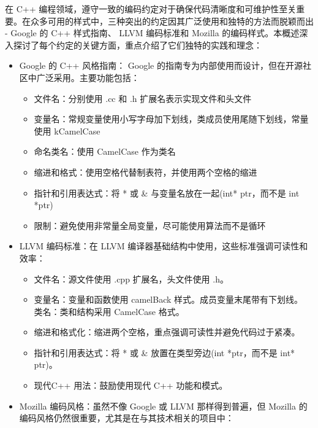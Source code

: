 在 C++ 编程领域，遵守一致的编码约定对于确保代码清晰度和可维护性至关重要。在众多可用的样式中，三种突出的约定因其广泛使用和独特的方法而脱颖而出 - Google 的 C++ 样式指南、 LLVM 编码标准和 Mozilla 的编码样式。本概述深入探讨了每个约定的关键方面，重点介绍了它们独特的实践和理念：

\begin{itemize}
\item
Google 的 C++ 风格指南： Google 的指南专为内部使用而设计，但在开源社区中广泛采用。主要功能包括：
\begin{itemize}
\item
文件名：分别使用 .cc 和 .h 扩展名表示实现文件和头文件

\item
变量名：常规变量使用小写字母加下划线，类成员使用尾随下划线，常量使用 kCamelCase

\item
命名类名：使用 CamelCase 作为类名

\item
缩进和格式：使用空格代替制表符，并使用两个空格的缩进

\item
指针和引用表达式：将 * 或 \& 与变量名放在一起(int* ptr，而不是 int *ptr)

\item
限制：避免使用非常量全局变量，尽可能使用算法而不是循环
\end{itemize}

\item
LLVM 编码标准：在 LLVM 编译器基础结构中使用，这些标准强调可读性和效率：

\begin{itemize}
\item
文件名：源文件使用 .cpp 扩展名，头文件使用 .h。

\item
变量名：变量和函数使用 camelBack 样式。成员变量末尾带有下划线。 类名：类和结构采用 CamelCase 格式。

\item
缩进和格式化：缩进两个空格，重点强调可读性并避免代码过于紧凑。

\item
指针和引用表达式：将 * 或 \& 放置在类型旁边(int *ptr，而不是 int* ptr)。

\item
现代C++ 用法：鼓励使用现代 C++ 功能和模式。
\end{itemize}

\item
Mozilla 编码风格：虽然不像 Google 或 LLVM 那样得到普遍，但 Mozilla 的编码风格仍然很重要，尤其是在与其技术相关的项目中：


\end{itemize}
